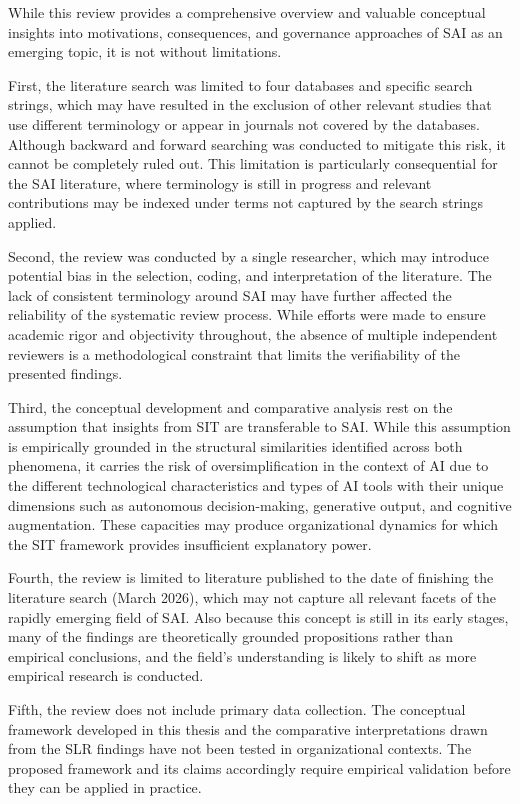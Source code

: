 \documentclass[12pt,oneside]{article}
\begin{document}
While this review provides a comprehensive overview and valuable conceptual insights into motivations, consequences, and governance approaches of \ac{SAI} as an emerging topic, it is not without limitations.

First, the literature search was limited to four databases and specific search strings, which may have resulted in the exclusion of other relevant studies that use different terminology or appear in journals not covered by the databases. Although backward and forward searching was conducted to mitigate this risk, it cannot be completely ruled out. This limitation is particularly consequential for the \ac{SAI} literature, where terminology is still in progress and relevant contributions may be indexed under terms not captured by the search strings applied.

Second, the review was conducted by a single researcher, which may introduce potential bias in the selection, coding, and interpretation of the literature. The lack of consistent terminology around \ac{SAI} may have further affected the reliability of the systematic review process. While efforts were made to ensure academic rigor and objectivity throughout, the absence of multiple independent reviewers is a methodological constraint that limits the verifiability of the presented findings.

Third, the conceptual development and comparative analysis rest on the assumption that insights from \ac{SIT} are transferable to \ac{SAI}. While this assumption is empirically grounded in the structural similarities identified across both phenomena, it carries the risk of oversimplification in the context of \ac{AI} due to the different technological characteristics and types of \ac{AI} tools with their unique dimensions such as autonomous decision-making, generative output, and cognitive augmentation. These capacities may produce organizational dynamics for which the \ac{SIT} framework provides insufficient explanatory power.

Fourth, the review is limited to literature published to the date of finishing the literature search (March 2026), which may not capture all relevant facets of the rapidly emerging field of \ac{SAI}. Also because this concept is still in its early stages, many of the findings are theoretically grounded propositions rather than empirical conclusions, and the field's understanding is likely to shift as more empirical research is conducted.

Fifth, the review does not include primary data collection. The conceptual framework developed in this thesis and the comparative interpretations drawn from the \ac{SLR} findings have not been tested in organizational contexts. The proposed framework and its claims accordingly require empirical validation before they can be applied in practice.
\end{document}

